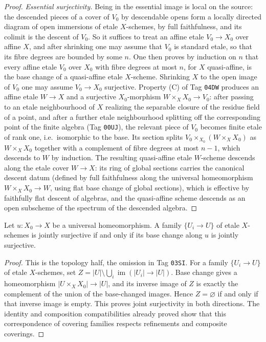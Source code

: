 \begin{proof}
\emph{Essential surjectivity.}  Being in the essential image is local on the
source: the descended pieces of a cover of $V_0$ by descendable opens form a
locally directed diagram of open immersions of etale $X$-schemes, by full
faithfulness, and its colimit is the descent of $V_0$.  So it suffices to
treat an affine etale $V_0\to X_0$ over affine $X$, and after shrinking one
may assume that $V_0$ is standard etale, so that its fibre degrees are
bounded by some $n$.  One then proves by induction on $n$ that every affine
etale $V_0$ over $X_0$ with fibre degrees at most $n$, for $X$ quasi-affine, is
the base change of a quasi-affine etale $X$-scheme.  Shrinking $X$ to the
open image of $V_0$ one may assume $V_0\to X_0$ surjective.  Property (C) of
Tag \texttt{04DW} produces an affine etale $W\to X$ and a surjective
$X_0$-morphism $W\times_XX_0\to V_0$: after passing to an etale neighbourhood
of $X$ realizing the separable closure of the residue field of a point, and
after a further etale neighbourhood splitting off the corresponding point of
the finite algebra (Tag \texttt{00UJ}), the relevant piece of $V_0$ becomes
finite etale of rank one, i.e.\ isomorphic to the base.  Its section splits
$V_0\times_{X_0}(W\times_XX_0)$ as $W\times_XX_0$ together with a complement
of fibre degrees at most $n-1$, which descends to $W$ by induction.  The
resulting quasi-affine etale $W$-scheme descends along the etale cover
$W\to X$: its ring of global sections carries the canonical descent datum
(defined by full faithfulness along the universal homeomorphism
$W\times_XX_0\to W$, using flat base change of global sections), which is
effective by faithfully flat descent of algebras, and the quasi-affine scheme
descends as an open subscheme of the spectrum of the descended algebra.
\end{proof}

\begin{lemma}
\label{lemma:weil-pbc-universal-homeomorphism-coverings}
\uses{}
\leanok

Let $u:X_0\to X$ be a universal homeomorphism.  A family $\{U_i\to U\}$ of
etale $X$-schemes is jointly surjective if and only if its base change along
$u$ is jointly surjective.
\end{lemma}
\begin{proof}
\leanok

This is the topology half, the omission in Tag \texttt{03SI}.  For a
family $\{U_i\to U\}$ of etale $X$-schemes, set
$Z=|U|\setminus\bigcup_i\operatorname{im}(|U_i|\to|U|)$.  Base change gives
a homeomorphism $|U\times_XX_0|\to|U|$, and its inverse image of $Z$ is
exactly the complement of the union of the base-changed images.  Hence
$Z=\varnothing$ if and only if that inverse image is empty.  This proves
joint surjectivity in both directions.  The identity and composition
compatibilities already proved show that this correspondence of covering
families respects refinements and composite coverings.
\end{proof}


